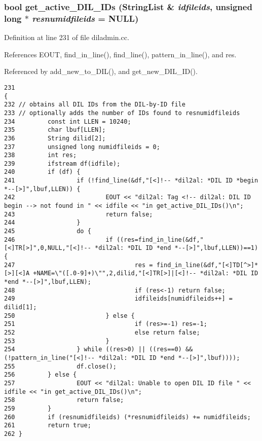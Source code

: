 \subsubsection{\setlength{\rightskip}{0pt plus 5cm}bool get\_\-active\_\-DIL\_\-IDs ({\bf String\-List} \& {\em idfileids}, unsigned long $\ast$ {\em resnumidfileids} = NULL)}\label{diladmin_8cc_a1}




Definition at line 231 of file diladmin.cc.

References EOUT, find\_\-in\_\-line(), find\_\-line(), pattern\_\-in\_\-line(), and res.

Referenced by add\_\-new\_\-to\_\-DIL(), and get\_\-new\_\-DIL\_\-ID().



\footnotesize\begin{verbatim}231                                                                                         {
232 // obtains all DIL IDs from the DIL-by-ID file
233 // optionally adds the number of IDs found to resnumidfileids
234         const int LLEN = 10240;
235         char lbuf[LLEN];
236         String dilid[2];
237         unsigned long numidfileids = 0;
238         int res;
239         ifstream df(idfile);
240         if (df) {
241                 if (!find_line(&df,"[<]!-- *dil2al: *DIL ID *begin *--[>]",lbuf,LLEN)) {
242                         EOUT << "dil2al: Tag <!-- dil2al: DIL ID begin --> not found in " << idfile << "in get_active_DIL_IDs()\n";
243                         return false;
244                 }
245                 do {
246                         if ((res=find_in_line(&df,"[<]TR[>]",0,NULL,"[<]!-- *dil2al: *DIL ID *end *--[>]",lbuf,LLEN))==1) {
247                                 res = find_in_line(&df,"[<]TD[^>]*[>][<]A +NAME=\"([.0-9]+)\"",2,dilid,"[<]TR[>]|[<]!-- *dil2al: *DIL ID *end *--[>]",lbuf,LLEN);
248                                 if (res<-1) return false;
249                                 idfileids[numidfileids++] = dilid[1];
250                         } else {
251                                 if (res>=-1) res=-1;
252                                 else return false;
253                         }
254                 } while ((res>0) || ((res==0) && (!pattern_in_line("[<]!-- *dil2al: *DIL ID *end *--[>]",lbuf))));
255                 df.close();
256         } else {
257                 EOUT << "dil2al: Unable to open DIL ID file " << idfile << "in get_active_DIL_IDs()\n";
258                 return false;
259         }
260         if (resnumidfileids) (*resnumidfileids) += numidfileids;
261         return true;
262 }
\end{verbatim}\normalsize 
{}
